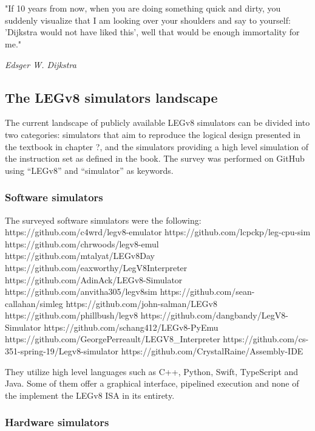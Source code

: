\chapter{}

\epigraph{"If 10 years from now, when you are doing something quick and dirty, you suddenly visualize that I am looking over your shoulders and say to yourself: 'Dijkstra would not have liked this', well that would be enough immortality for me."}{\textit{Edsger W. Dijkstra}}

\section*{The LEGv8 simulators landscape}

The current landscape of publicly available LEGv8 simulators can be divided into two categories: simulators that aim to reproduce the logical design presented in the textbook in chapter ?, and the simulators providing a high level simulation of the instruction set as defined in the book.
The survey was performed on GitHub using ``LEGv8'' and ``simulator'' as keywords.

\subsection*{Software simulators}

The surveyed software simulators were the following:
https://github.com/c4wrd/legv8-emulator
https://github.com/lcpckp/leg-cpu-sim
https://github.com/chrwoods/legv8-emul
https://github.com/mtalyat/LEGv8Day
https://github.com/eaxworthy/LegV8Interpreter
https://github.com/AdinAck/LEGv8-Simulator
https://github.com/anvitha305/legv8sim
https://github.com/sean-callahan/simleg
https://github.com/john-salman/LEGv8
https://github.com/phillbush/legv8
https://github.com/dangbandy/LegV8-Simulator
https://github.com/schang412/LEGv8-PyEmu
https://github.com/GeorgePerreault/LEGV8_Interpreter
https://github.com/cs-351-spring-19/Legv8-simulator
https://github.com/CrystalRaine/Assembly-IDE

They utilize high level languages such as C++, Python, Swift, TypeScript and Java. Some of them offer a graphical interface, pipelined execution and none of the implement the LEGv8 ISA in its entirety.



\subsection*{Hardware simulators}


